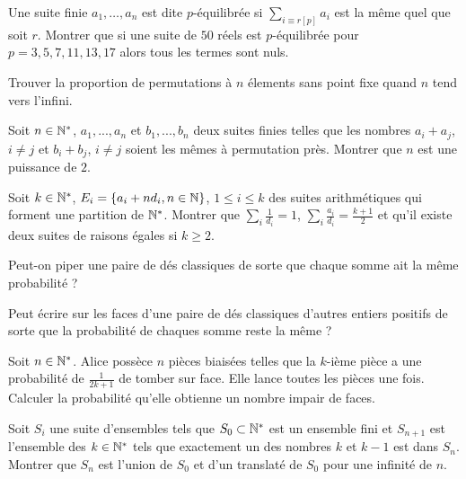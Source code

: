 \begin{exo}
Une suite finie $a_1, \dots, a_n$ est dite $p$-équilibrée si $\sum_{i\equiv r[p]}a_i$ est la même quel que soit $r$. Montrer que si une suite de $50$ réels est $p$-équilibrée pour $p=3,5,7,11,13,17$ alors tous les termes sont nuls.
\end{exo}

\begin{exo}
Trouver la proportion de permutations à $n$ élements sans point fixe quand $n$ tend vers l'infini.
\end{exo}

\begin{exo}
Soit $n\in\mathbb N^*$, $a_1,...,a_n$ et $b_1,...,b_n$ deux suites finies telles que les nombres $a_i+a_j$, $i\neq j$ et $b_i+b_j$, $i\neq j$ soient les mêmes à permutation près. Montrer que $n$ est une puissance de $2$.
\end{exo}

\begin{exo}
Soit $k\in\mathbb N^*$, $E_i=\{a_i+nd_i, n\in\mathbb N\}$, $1\leq i\leq k$ des suites arithmétiques qui forment une partition de $\mathbb N^*$. Montrer que $\sum_{i}\frac{1}{d_i}=1$, $\sum_{i}\frac{a_i}{d_i}=\frac{k+1}{2}$ et qu'il existe deux suites de raisons égales si $k\geq 2$.
\end{exo}

\begin{exo}
Peut-on piper une paire de dés classiques de sorte que chaque somme ait la même probabilité ?
\end{exo}

\begin{exo}
Peut écrire sur les faces d'une paire de dés classiques d'autres entiers positifs de sorte que la probabilité de chaques somme reste la même ?
\end{exo}

\begin{exo}
Soit $n\in\mathbb N^*$. Alice possèce $n$ pièces biaisées telles que la $k$-ième pièce a une probabilité de $\frac{1}{2k+1}$ de tomber sur face. Elle lance toutes les pièces une fois. Calculer la probabilité qu'elle obtienne un nombre impair de faces.
\end{exo}

\begin{exo}
Soit $S_i$ une suite d'ensembles tels que $S_0\subset\mathbb N^*$ est un ensemble fini et $S_{n+1}$ est l'ensemble des $k\in\mathbb N^*$ tels que exactement un des nombres $k$ et $k-1$ est dans $S_n$. Montrer que $S_n$ est l'union de $S_0$ et d'un translaté de $S_0$ pour une infinité de $n$.
\end{exo}

